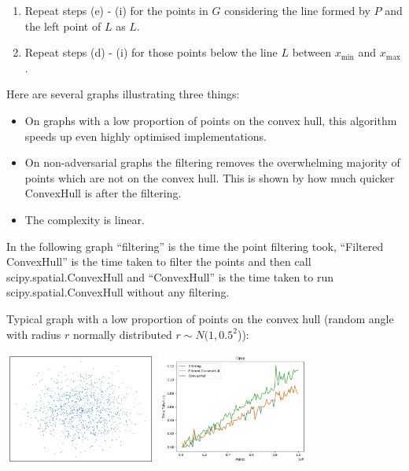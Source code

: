 \documentclass[10pt,\jkfside,a4paper]{article}
\begin{document}
\begin{enumerate}
\begin{enumerate}[label=(\alph*)]
\item Repeat steps (e) - (i) for the points in $G$ considering the line formed by $P$ and 
the left point of $L$ as $L$.

\item Repeat steps (d) - (i) for those points below the line $L$ between $x_\text{min}$ and $x_\text{max}$.

\end{enumerate}

Here are several graphs illustrating three things: 

\begin{itemize}

\item On graphs with a low proportion of points on the convex hull, this algorithm 
speeds up even highly optimised implementations.

\item On non-adversarial graphs the filtering removes the overwhelming majority of points 
which are not on the convex hull. This is shown by how much quicker ConvexHull is after 
the filtering.

\item The complexity is linear.

\end{itemize}

In the following graph ``filtering'' is the time the point filtering took, 
``Filtered ConvexHull'' is the time taken to filter the points and then call 
scipy.spatial.ConvexHull and ``ConvexHull'' is the time taken to run scipy.spatial.ConvexHull 
without any filtering.

Typical graph with a low proportion of points on the convex hull 
(random angle with radius $r$ normally distributed $r \sim N(1, 0.5^2$)):
\begin{center}
\includegraphics[width=5cm]{normalvariate}
\includegraphics[width=5cm]{normalvariate_times}
\end{center}


\end{enumerate}
\end{document}
